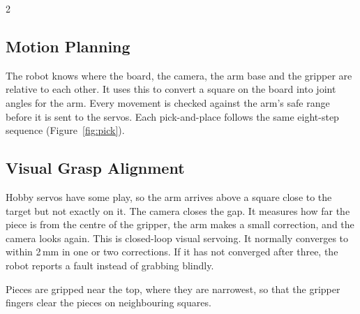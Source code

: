 \documentclass[10pt,a4paper]{article}
\begin{document}
\begin{multicols}{2}
\subsection{Motion Planning}
The robot knows where the board, the camera, the arm base and the gripper are relative to
each other. It uses this to convert a square on the board into joint angles for the arm. Every
movement is checked against the arm's safe range before it is sent to the servos.
Each pick-and-place follows the same eight-step sequence (Figure~\ref{fig:pick}).

\begin{center}
\label{fig:pick}
\end{center}

\subsection{Visual Grasp Alignment}
Hobby servos have some play, so the arm arrives above a square close to the target but not exactly
on it. The camera closes the gap. It measures how far the piece is from the centre of the gripper,
the arm makes a small correction, and the camera looks again. This is closed-loop visual servoing.
It normally converges to within 2\,mm in one or two corrections. If it has not converged after three,
the robot reports a fault instead of grabbing blindly.

Pieces are gripped near the top, where they are narrowest, so that the gripper fingers clear
the pieces on neighbouring squares.


\end{multicols}
\end{document}
